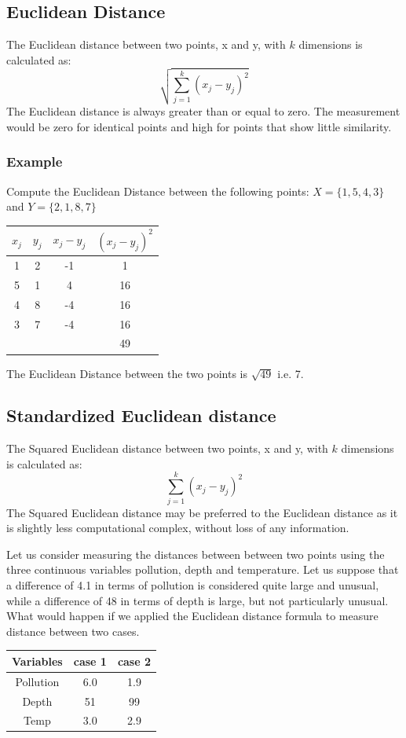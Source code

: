 \documentclass[a4paper,12pt]{article}
\begin{document}
\subsection*{Euclidean Distance}
The Euclidean distance between two points, x and y, with $k$ dimensions is calculated as:
\[ \sqrt{ \sum^{k}_{j=1} ( x_j - y_j)^2 } \]
The Euclidean distance is always greater than or equal to zero. The measurement would be zero for identical points and high for points that show little similarity.

\subsubsection*{Example}
Compute the Euclidean Distance between the following points:
$X = \{1,5,4,3\}$ and $Y = \{2,1,8,7\}$

\begin{center}
\begin{tabular}{|c|c|c|c|}
  \hline
$x_j$	&	$y_j$	&   $x_j - y_j$	&	$(x_j - y_j)^2$	\\ \hline
1	&	2	&	-1	&	1	\\
5	&	1	&	4	&	16	\\
4	&	8	&	-4	&	16	\\
3	&	7	&	-4	&	16	\\ \hline
	&		&		&	49	\\ \hline
\end{tabular}
\end{center}
The Euclidean Distance between the two points is $\sqrt{49}$ i.e. 7.

\subsection*{Standardized Euclidean distance}
The Squared Euclidean distance between two points, x and y, with $k$ dimensions is calculated as:
\[ \sum^{k}_{j=1} ( x_j - y_j)^2  \]
The Squared Euclidean distance may be preferred to the Euclidean distance as it is slightly less computational complex, without loss of any information.



Let us consider measuring the distances between between two points using
the three continuous variables pollution, depth and temperature. Let us suppose that a difference of 4.1 in terms of pollution is considered quite large and unusual, while a difference of 48 in terms of depth is large, but not particularly unusual.
What would happen if we applied the Euclidean distance formula to measure distance between two cases.
\begin{center}
\begin{tabular}{|c|c|c|}
  \hline
Variables & case 1 & case 2 \\ \hline 
Pollution & 6.0 & 1.9 \\
Depth & 51 & 99 \\
Temp & 3.0 & 2.9 \\
  \hline
\end{tabular}
\end{center}
\end{document}

